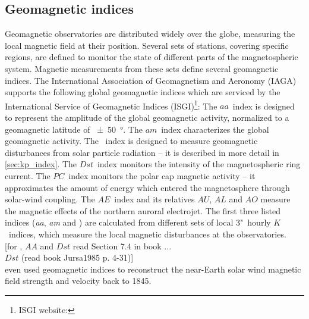 \subsection{Geomagnetic indices}
\label{sec:geomagnetic_indices}
Geomagnetic observatories are distributed widely over the globe, measuring the local magnetic field at their position. Several sets of stations, covering specific regions, are defined to monitor the state of different parts of the magnetospheric system. Magnetic measurements from these sets define several geomagnetic indices. The International Association of Geomagnetism and Aeronomy (IAGA) supports the following global geomagnetic indices which are serviced by the International Service of Geomagnetic Indices (ISGI)\footnote{ISGI website: }:
The $aa$~index is designed to represent the amplitude of the global geomagnetic activity, normalized to a geomagnetic latitude of \SI{+-50}{\degree}. The $am$~index characterizes the global geomagnetic activity. The \Kp{}~index is designed to measure geomagnetic disturbances from solar particle radiation -- it is described in more detail in \autoref{sec:kp_index}. The $Dst$~index monitors the intensity of the magnetospheric ring current. The $PC$~index monitors the polar cap magnetic activity -- it approximates the amount of energy which entered the magnetosphere through solar-wind coupling. The $AE$~index and its relatives $AU$, $AL$ and $AO$ measure the magnetic effects of the northern auroral electrojet.
The first three listed indices (\textit{aa}, \textit{am} and \Kp{}) are calculated from different sets of local 3"~hourly $K$~indices, which measure the local magnetic disturbances at the observatories.\\

[for \Kp{}, $AA$ and $Dst$ read Section 7.4 in book \citet{Bothmer2007}...\\
$Dst$ (read book Jursa1985 p. 4-31)]\\

\citet{Lockwood2014} even used geomagnetic indices to reconstruct the near-Earth solar wind magnetic field strength and velocity back to 1845.\\






